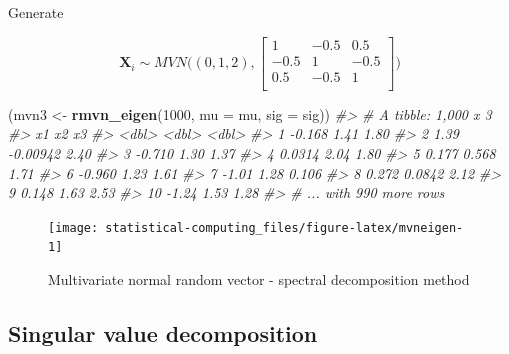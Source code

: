 \documentclass[]{book}
\newenvironment{Shaded}{\begin{snugshade}}{\end{snugshade}}
\newcommand{\CommentTok}[1]{\textcolor[rgb]{0.56,0.35,0.01}{\textit{#1}}}
\newcommand{\DataTypeTok}[1]{\textcolor[rgb]{0.13,0.29,0.53}{#1}}
\newcommand{\DecValTok}[1]{\textcolor[rgb]{0.00,0.00,0.81}{#1}}
\newcommand{\KeywordTok}[1]{\textcolor[rgb]{0.13,0.29,0.53}{\textbf{#1}}}
\newcommand{\NormalTok}[1]{#1}
\newcommand{\OperatorTok}[1]{\textcolor[rgb]{0.81,0.36,0.00}{\textbf{#1}}}
\newcommand{\StringTok}[1]{\textcolor[rgb]{0.31,0.60,0.02}{#1}}
\theoremstyle{definition}
\theoremstyle{definition}
\theoremstyle{definition}
\theoremstyle{remark}
\begin{document}
Generate

\[\mathbf{X}_i \sim MVN\bigg((0, 1, 2), \begin{bmatrix} 1&-0.5&0.5 \\ -0.5&1&-0.5 \\ 0.5&-0.5&1 \\ \end{bmatrix}\bigg)\]

\begin{Shaded}
\begin{Highlighting}[]
\NormalTok{(mvn3 <-}\StringTok{ }\KeywordTok{rmvn_eigen}\NormalTok{(}\DecValTok{1000}\NormalTok{, }\DataTypeTok{mu =}\NormalTok{ mu, }\DataTypeTok{sig =}\NormalTok{ sig))}
\CommentTok{#> # A tibble: 1,000 x 3}
\CommentTok{#>         x1       x2    x3}
\CommentTok{#>      <dbl>    <dbl> <dbl>}
\CommentTok{#>  1 -0.168   1.41    1.80 }
\CommentTok{#>  2  1.39   -0.00942 2.40 }
\CommentTok{#>  3 -0.710   1.30    1.37 }
\CommentTok{#>  4  0.0314  2.04    1.80 }
\CommentTok{#>  5  0.177   0.568   1.71 }
\CommentTok{#>  6 -0.960   1.23    1.61 }
\CommentTok{#>  7 -1.01    1.28    0.106}
\CommentTok{#>  8  0.272   0.0842  2.12 }
\CommentTok{#>  9  0.148   1.63    2.53 }
\CommentTok{#> 10 -1.24    1.53    1.28 }
\CommentTok{#> # ... with 990 more rows}
\end{Highlighting}
\end{Shaded}

\begin{Shaded}
\end{Shaded}

\begin{figure}[H]

{\centering \texttt{[image: statistical-computing\_files/figure-latex/mvneigen-1]} 

}

\caption{Multivariate normal random vector - spectral decomposition method}\label{fig:mvneigen}
\end{figure}

\hypertarget{singular-value-decomposition}{%
\subsection{Singular value decomposition}\label{singular-value-decomposition}}
\end{document}
